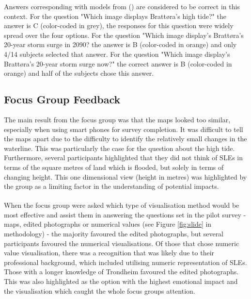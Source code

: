  Answers corresponding with models from (\cite{kartverket_se_2020}) are considered to be correct in this context.  For the question "Which image displays Brattøra's high tide?" the answer is C (color-coded in grey), the responses for this question were widely spread over the four options. For the question "Which image display's Brattøra's 20-year storm surge in 2090? the answer is B (color-coded in orange) and only 4/14 subjects selected that answer. For the question "Which image display's Brattøra's 20-year storm surge now?" the correct answer is B (color-coded in orange) and half of the subjects chose this answer. 
\paragraph{}


\subsection{Focus Group Feedback}
The main result from the focus group  was that the maps looked too similar, especially when using smart phones for survey completion. It was difficult to tell the maps apart due to the difficulty to identify the relatively small changes in the waterline. This was particularly the case for the question about the high tide. Furthermore, several participants highlighted that they did not think of SLEs in terms of the square metres of land which is flooded, but solely in terms of changing height. This one dimensional view (height in metres) was highlighted by the group as a limiting factor in the understanding of potential impacts. 
\paragraph{}

When the focus group were asked which type of visualisation method would be most effective and assist them in answering the questions set in the pilot survey - maps, edited photographs or numerical values (see Figure \ref{fig:slide} in methodology) - the majority favoured the edited photographs, but several participants favoured the numerical visualisations.
Of those that chose numeric value visualisation, there was a recognition that was likely due to their professional background, which included utilising numeric representation of SLEs. Those with a longer knowledge of Trondheim favoured the edited photographs. This was also highlighted as the option with the highest emotional impact and the visualisation which caught the whole focus groups attention.
